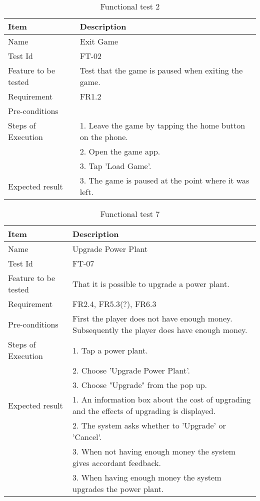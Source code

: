 \begin{table}[H]
\centering
	\begin{tabular}{ l | p{8cm} }
		\hline
		{\bf Item} & {\bf Description} \\ \hline
		Name & Exit Game \\ 
		Test Id & FT-02 \\ 
		Feature to be tested & Test that the game is paused when exiting the game. \\ 
		Requirement & FR1.2 \\ 
		Pre-conditions & \\ 
		Steps of Execution & 1. Leave the game by tapping the home button on the phone. \\
		& 2. Open the game app. \\
		& 3. Tap 'Load Game'. \\
		Expected result & 3. The game is paused at the point where it was left. \\  
	\end{tabular}
	\caption{Functional test 2}
\end{table}

\begin{table}[H]
\centering
	\begin{tabular}{ l | p{8cm} }
		\hline
		{\bf Item} & {\bf Description} \\ \hline
		Name & Upgrade Power Plant\\ 
		Test Id & FT-07 \\ 
		Feature to be tested & That it is possible to upgrade a power plant. \\ 
		Requirement & FR2.4, FR5.3(?), FR6.3 \\ 
		Pre-conditions & First the player does not have enough money. Subsequently the player does have enough money. \\ 
		Steps of Execution & 1. Tap a power plant. \\ 
		& 2. Choose 'Upgrade Power Plant'. \\
		& 3. Choose "Upgrade" from the pop up. \\
		Expected result & 1. An information box about the cost of upgrading and the effects of upgrading is displayed. \\
		& 2. The system asks whether to 'Upgrade' or 'Cancel'. \\
		& 3. When not having enough money the system gives accordant feedback. \\
		& 3. When having enough money the system upgrades the power plant. \\
	\end{tabular}
	\caption{Functional test 7}
\end{table}

